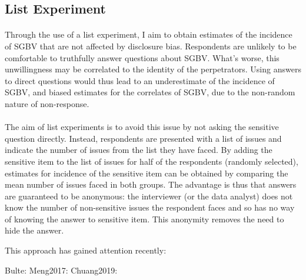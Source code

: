 \documentclass[11pt,a4paper]{scrartcl} %
\begin{document}
\subsection*{List Experiment}
\paragraph{}
Through the use of a list experiment, I aim to obtain estimates of the incidence of SGBV that are not affected by disclosure bias. Respondents are unlikely to be comfortable to truthfully answer questions about SGBV. What's worse, this unwillingness may be correlated to the identity of the perpetrators\citep{Stark2017}. Using answers to direct questions would thus lead to an underestimate of the incidence of SGBV, and biased estimates for the correlates of SGBV, due to the non-random nature of non-response.

\paragraph{}
The aim of list experiments is to avoid this issue by not asking the sensitive question directly. Instead, respondents are presented with a list of issues and indicate the number of issues from the list they have faced. By adding the sensitive item to the list of issues for half of the respondents (randomly selected), estimates for incidence of the sensitive item can be obtained by comparing the mean number of issues faced in both groups. The advantage is thus that answers are guaranteed to be anonymous: the interviewer (or the data analyst) does not know the number of non-sensitive issues the respondent faces and so has no way of knowing the answer to sensitive item. This anonymity removes the need to hide the answer. 

This approach has gained attention recently:

Bulte:
Meng2017:
Chuang2019:

\end{document}
